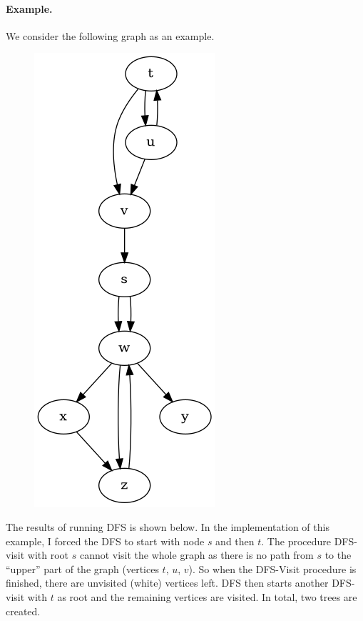 \paragraph{Example.} We consider the following graph as an example.

\begin{figure}[H]
\centering
\includegraphics[scale=0.4]{images/dfs_01.png}
\end{figure}

The results of running DFS is shown below. In the implementation of this example, I forced the DFS to start with node $s$ and then $t$. The procedure DFS-visit with root $s$ cannot visit the whole graph as there is no path from $s$ to the ``upper'' part of the graph (vertices $t$, $u$, $v$). So when the DFS-Visit procedure is finished, there are unvisited (white) vertices left. DFS then starts another DFS-visit with $t$ as root and the remaining vertices are visited. In total, two trees are created.

